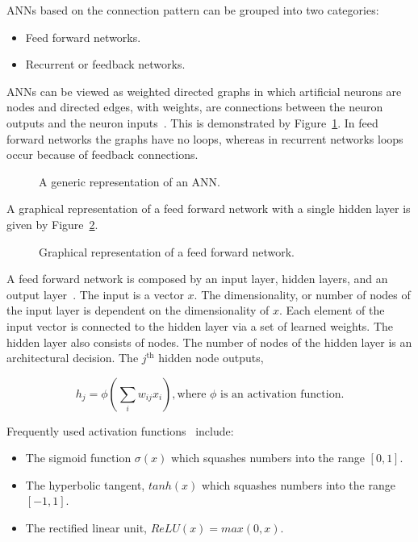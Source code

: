 ANNs based on the connection pattern can be grouped into two categories:

\begin{itemize}
    \item Feed forward networks.
    \item Recurrent or feedback networks.
\end{itemize}

ANNs can be viewed as weighted directed graphs in which artificial neurons are
nodes and directed edges, with weights, are connections between the neuron
outputs and the neuron inputs~\cite{Jain1996}. This is demonstrated by Figure~\ref{fig:ann}.
In feed forward networks the
graphs have no loops, whereas in recurrent networks loops occur because of feedback
connections.

\begin{figure}[!htbp]
    \centering
    
    \caption{A generic representation of an ANN.}\label{fig:ann}
\end{figure}

A graphical representation of a feed forward network with a single hidden layer
is given by Figure~\ref{fig:feedforward_network}.

\begin{figure}[!htbp]
    \centering
    
    \caption{Graphical representation of a feed forward network.}\label{fig:feedforward_network}
\end{figure}

A feed forward network is composed by an input layer, hidden layers, and an
output layer~\cite{Jain1996, Krose1993}. The input is a vector \(x\). The dimensionality, or
number of nodes of the input layer is dependent on the dimensionality of \(x\).
Each element of the input vector is connected to the hidden layer via a set of
learned weights. The hidden layer also consists of nodes. The number of
nodes of the hidden layer is an architectural decision. The \(j^{\text{th}}\)
hidden node outputs,

\[h_j = \phi (\sum_{i} w_{ij} x_{i}), \text{where } \phi  \text{ is an activation function}.\]

Frequently used activation functions~\cite{Karlik2011, Krose1993} include:

\begin{itemize}
    \item The sigmoid function \(\sigma(x)\) which squashes numbers into the range \([0, 1]\).
    \item The hyperbolic tangent, \(tanh(x)\) which squashes numbers into the range \([-1, 1]\).
    \item The rectified linear unit, \(ReLU(x)=max(0,x)\).
\end{itemize}


